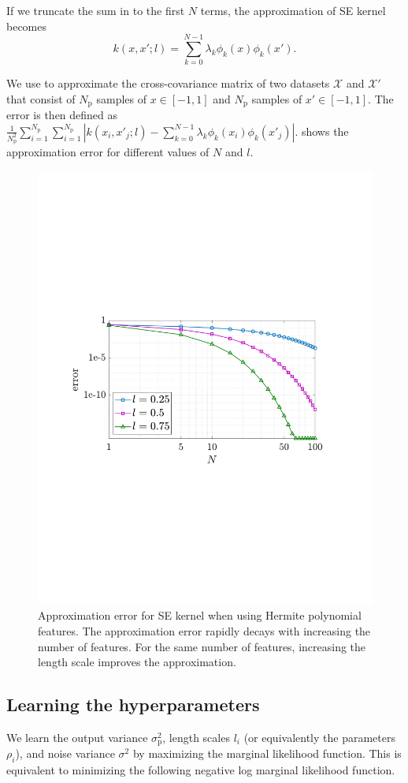 \documentclass{article}
\begin{document}
If we truncate the sum in  to the first $N$ terms, the approximation of SE kernel becomes
\begin{equation}\label{eqn622}
	k(x, x'; l) = \sum_{k=0}^{N-1} \lambda_k \phi_k(x) \phi_k(x').
\end{equation}

We use  to approximate the cross-covariance matrix of two datasets $\mathcal{X}$ and $\mathcal{X}'$ that consist of $N_\text{p}$ samples of $x \in [-1,1]$ and $N_\text{p}$ samples of $x' \in [-1,1]$.
The error is then defined as $\frac{1}{N_\text{p}^2} \sum_{i=1}^{N_\text{p}} \sum_{i=1}^{N_\text{p}}| k(x_i,x'_j;l) -  \sum_{k=0}^{N-1} \lambda_k \phi_k(x_i) \phi_k(x'_j)|$.
 shows the approximation error for different values of $N$ and $l$.

\begin{figure}[t]
	\centering
	\includegraphics[width=0.6\linewidth]{img/approxError.pdf}
	\caption{Approximation error for SE kernel when using Hermite polynomial features. The approximation error rapidly decays with increasing the number of features. For the same number of features, increasing the length scale improves the approximation.}
	\label{fig:approxError}
\end{figure}

\subsection{Learning the hyperparameters}
\label{sec:hyperparameters}
We learn the output variance $\sigma^2_\text{p}$, length scales $l_i$ (or equivalently the parameters $\rho_i$), and noise variance $\sigma^2$ by maximizing the marginal likelihood function.
This is equivalent to minimizing the following negative log marginal likelihood function.
\end{document}
